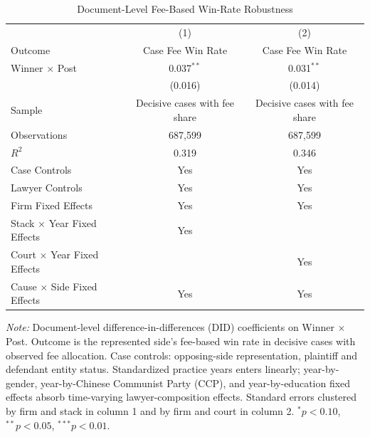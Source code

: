 \begin{table}[!htbp]
\setlength{\abovecaptionskip}{0pt}
\centering
\caption{Document-Level Fee-Based Win-Rate Robustness}
\label{tab:document_level_fee_winrate_appendix}
\begin{threeparttable}
\begin{tabular}{lcc}
\toprule
 & (1) & (2) \\
Outcome & Case Fee Win Rate & Case Fee Win Rate \\
\midrule
Winner $\times$ Post & 0.037$^{**}$ & 0.031$^{**}$ \\
& (0.016) & (0.014) \\
\addlinespace
Sample & Decisive cases with fee share & Decisive cases with fee share \\
Observations & 687,599 & 687,599 \\
$R^2$ & 0.319 & 0.346 \\
Case Controls & Yes & Yes \\
Lawyer Controls & Yes & Yes \\
Firm Fixed Effects & Yes & Yes \\
Stack $\times$ Year Fixed Effects & Yes &  \\
Court $\times$ Year Fixed Effects &  & Yes \\
Cause $\times$ Side Fixed Effects & Yes & Yes \\
\bottomrule
\end{tabular}
\begin{tablenotes}[flushleft]
\footnotesize
\item \textit{Note:} Document-level difference-in-differences (DID) coefficients on Winner $\times$ Post. Outcome is the represented side's fee-based win rate in decisive cases with observed fee allocation. Case controls: opposing-side representation, plaintiff and defendant entity status. Standardized practice years enters linearly; year-by-gender, year-by-Chinese Communist Party (CCP), and year-by-education fixed effects absorb time-varying lawyer-composition effects. Standard errors clustered by firm and stack in column 1 and by firm and court in column 2. $^{*}p<0.10$, $^{**}p<0.05$, $^{***}p<0.01$.
\end{tablenotes}
\end{threeparttable}
\end{table}
